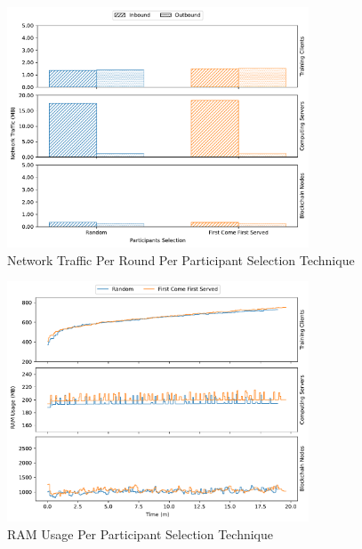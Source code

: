 \begin{figure}[!ht]
    \centering
    \centering
    \includegraphics[width=0.8\textwidth]{graphics/selection/net.pdf}
    \caption{Network Traffic Per Round Per Participant Selection Technique}
    \label{fig:net_selection}
\end{figure}

\begin{figure}[!hpt]
    \centering
    \centering
    \includegraphics[width=0.8\textwidth]{graphics/selection/ram.pdf}
    \caption{RAM Usage Per Participant Selection Technique}
    \label{fig:ram_selection}
\end{figure}


